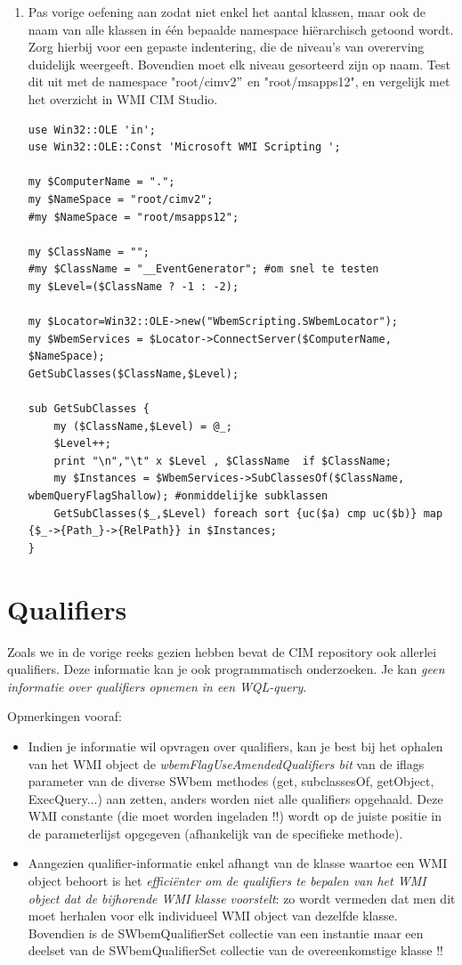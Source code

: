 \documentclass[11pt,a4paper]{report}
\begin{document}
\begin{enumerate}[resume]
\begin{lstlisting}
	\end{lstlisting}
	\item Pas vorige oefening aan zodat niet enkel het aantal klassen, maar ook de naam van alle klassen in één bepaalde namespace hiërarchisch getoond wordt. Zorg hierbij voor een gepaste indentering, die de niveau's van overerving duidelijk weergeeft. Bovendien moet elk niveau gesorteerd zijn op naam. Test dit uit met de namespace "root/cimv2$"$ en "root/msapps12", en vergelijk met het overzicht in WMI CIM Studio.
	\begin{lstlisting}
use Win32::OLE 'in';
use Win32::OLE::Const 'Microsoft WMI Scripting ';

my $ComputerName = ".";
my $NameSpace = "root/cimv2";
#my $NameSpace = "root/msapps12";

my $ClassName = "";
#my $ClassName = "__EventGenerator"; #om snel te testen
my $Level=($ClassName ? -1 : -2);

my $Locator=Win32::OLE->new("WbemScripting.SWbemLocator");
my $WbemServices = $Locator->ConnectServer($ComputerName, $NameSpace);
GetSubClasses($ClassName,$Level);

sub GetSubClasses {
	my ($ClassName,$Level) = @_;
	$Level++;
	print "\n","\t" x $Level , $ClassName  if $ClassName;	
	my $Instances = $WbemServices->SubClassesOf($ClassName, wbemQueryFlagShallow); #onmiddelijke subklassen
	GetSubClasses($_,$Level) foreach sort {uc($a) cmp uc($b)} map {$_->{Path_}->{RelPath}} in $Instances;
}
	\end{lstlisting}
\end{enumerate}
\section{Qualifiers}
Zoals we in de vorige reeks gezien hebben bevat de CIM repository ook allerlei qualifiers. Deze informatie kan je ook programmatisch onderzoeken.
Je kan \textit{geen informatie over qualifiers opnemen in een WQL-query}.
\par Opmerkingen vooraf:
\begin{itemize}
	\item Indien je informatie wil opvragen over qualifiers, kan je best bij het ophalen van het WMI object de \textit{wbemFlagUseAmendedQualifiers bit} van de iflags parameter van de diverse SWbem methodes (get, subclassesOf, getObject, ExecQuery...) aan zetten, anders worden niet alle qualifiers opgehaald. Deze WMI constante (die moet worden ingeladen !!) wordt op de juiste positie in de parameterlijst opgegeven (afhankelijk van de specifieke methode).
	\item Aangezien qualifier-informatie enkel afhangt van de klasse waartoe een WMI object behoort is het \textit{efficiënter om de qualifiers te bepalen van het WMI object dat de bijhorende WMI klasse voorstelt}: zo wordt vermeden dat men dit moet herhalen voor elk individueel WMI object van dezelfde klasse. Bovendien is de SWbemQualifierSet collectie van een instantie maar een deelset van de SWbemQualifierSet collectie van de overeenkomstige klasse !!
\end{itemize}
\end{document}
